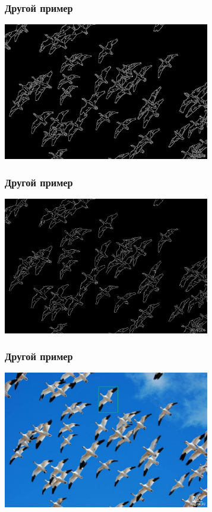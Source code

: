 \begin{frame}\frametitle{Другой пример}
    \begin{center}
        \includegraphics[height=6cm]{veselov_imgs/edge_map1.jpg}
    \end{center}
\end{frame}

\begin{frame}\frametitle{Другой пример}
    \begin{center}
        \includegraphics[height=6cm]{veselov_imgs/l_edge_map1.jpg}
    \end{center}
\end{frame}

\begin{frame}\frametitle{Другой пример}
    \begin{center}
        \includegraphics[height=6cm]{veselov_imgs/occurrence1.jpg}
    \end{center}
\end{frame}

